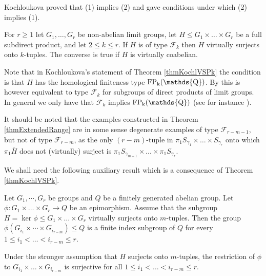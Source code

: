 Kochloukova proved that (1) implies (2) and gave conditions under which (2) implies (1).

\begin{theorem}
 For $r\geq 1$ let $G_1, \dots , G_r$ be non-abelian limit groups, let $H\leq G_1\times \dots \times G_r$ be a full subdirect product, and let $2\leq k \leq r$. If $H$ is of type $\mathcal{F}_k$ then $H$ virtually surjects onto $k$-tuples. The converse is true if $H$ is virtually coabelian.
 \label{thmKochlVSPk}
\end{theorem}

Note that in Kochloukova's statement of Theorem \ref{thmKochlVSPk} the condition is that $H$ has the homological finiteness type $\rm{FP}_k(\mathds{Q})$. By \cite[Corollary E]{BriHowMilSho-13} this is however equivalent to type $\mathcal{F}_k$ for subgroups of direct products of limit groups. In general we only have that $\mathcal{F}_k$ implies $\rm{FP}_k(\mathds{Q})$ (see for instance \cite[Section 8.2]{Geo-08}).

\begin{remark}
It should be noted that the examples constructed in Theorem \ref{thmExtendedRange} are in some sense degenerate examples of type $\mathcal{F}_{r-m-1}$, but not of type $\mathcal{F}_{r-m}$, as the only $(r-m)$-tuple in $\pi_1 S_{\gamma_1}\times \dots \times S_{\gamma_r}$ onto which $\pi_1 \overline{H}$ does not (virtually) surject is $\pi_1 S_{\gamma_{m+1}}\times \dots \times \pi_1 S_{\gamma_r}$.
\end{remark}

We shall need the following auxiliary result which is a consequence of Theorem \ref{thmKochlVSPk}.

\begin{lemma}
 Let $G_1,\cdots, G_r$ be groups and $Q$ be a finitely generated abelian group. Let $\phi: G_1 \times \dots \times G_r \rightarrow Q$ be an epimorphism. Assume that the subgroup $H=\ker \phi \leq G_1\times \dots \times G_r$ virtually surjects onto $m$-tuples. Then the group $\phi( G_{i_1}\times \cdots \times G_{i_{r-m}})\leq Q$ is a finite index subgroup of $Q$ for every $1\leq i_1 < \dots < i_{r-m}\leq r$.
 
 Under the stronger assumption that $H$ surjects onto $m$-tuples, the restriction  of $\phi$ to $G_{i_1}\times \dots \times G_{i_{r-m}}$ is surjective for all $1\leq i_1 < \dots < i_{r-m}\leq r$.
\label{lemSurjComp}
\end{lemma}

